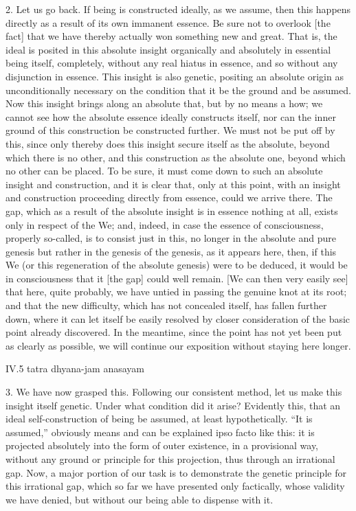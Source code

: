 2. Let us go back.
If being is constructed ideally, as we assume,
then this happens directly as
a result of its own immanent essence.
Be sure not to overlook [the fact] that we have thereby
actually won something new and great.
That is, the ideal is posited in this absolute insight
organically and absolutely in essential being itself,
completely, without any real hiatus in essence,
and so without any disjunction in essence.
This insight is also genetic,
positing an absolute origin as unconditionally necessary
on the condition that it be the ground and be assumed.
Now this insight brings along an absolute that,
but by no means a how; we cannot see how
the absolute essence ideally constructs itself,
nor can the inner ground of this construction be constructed further.
We must not be put off by this, since only thereby does
this insight secure itself as the absolute,
beyond which there is no other,
and this construction as the absolute one,
beyond which no other can be placed.
To be sure, it must come down to such
an absolute insight and construction,
and it is clear that, only at this point,
with an insight and construction proceeding
directly from essence, could we arrive there.
The gap, which as a result of
the absolute insight is in essence nothing at all,
exists only in respect of the We;
and, indeed, in case the essence of consciousness,
properly so-called, is to consist just in this,
no longer in the absolute and pure genesis
but rather in the genesis of the genesis, as it appears here,
then, if this We (or this regeneration of the absolute genesis)
were to be deduced, it would be in consciousness
that it [the gap] could well remain.
[We can then very easily see] that here, quite probably,
we have untied in passing the genuine knot at its root;
and that the new difficulty,
which has not concealed itself,
has fallen further down,
where it can let itself
be easily resolved by closer consideration
of the basic point already discovered.
In the meantime, since the point has
not yet been put as clearly as possible,
we will continue our exposition without staying here longer.

IV.5
tatra dhyana-jam anasayam

3. We have now grasped this.
Following our consistent method,
let us make this insight itself genetic.
Under what condition did it arise?
Evidently this, that an ideal
self-construction of being be assumed,
at least hypothetically.
“It is assumed,” obviously means and
can be explained ipso facto like this:
it is projected absolutely
into the form of outer existence,
in a provisional way,
without any ground or principle
for this projection,
thus through an irrational gap.
Now, a major portion of our task is
to demonstrate the genetic principle
for this irrational gap,
which so far we have presented only factically,
whose validity we have denied,
but without our being able to dispense with it.

